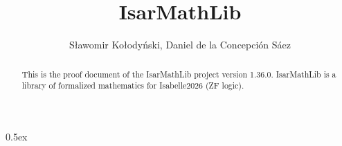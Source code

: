 \documentclass[11pt,a4paper]{article}
\begin{document}
\title{IsarMathLib}
\author{S\l awomir Ko\l ody\'{n}ski, Daniel de la Concepci\'{o}n S\'{a}ez}
\maketitle

\begin{abstract}
This is the proof document of the IsarMathLib project version 1.36.0. 
IsarMathLib is a library of formalized mathematics for Isabelle2026 (ZF logic). 
 
\end{abstract}

\tableofcontents

\parindent 0pt\parskip 0.5ex





\end{document}
